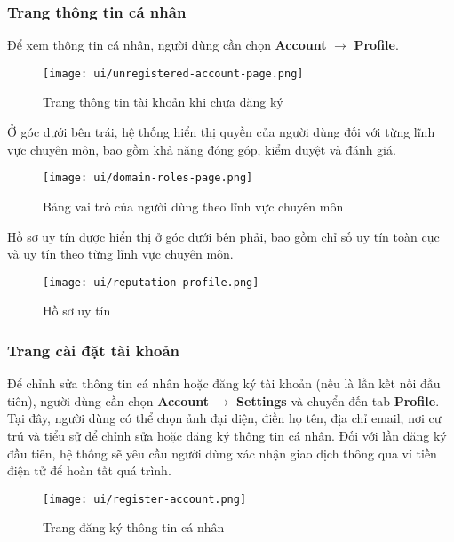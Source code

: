 \subsubsection{Trang thông tin cá nhân}

Để xem thông tin cá nhân, người dùng cần chọn \textbf{Account} $\rightarrow$ \textbf{Profile}.

\begin{figure}[H]
  \centering
  \texttt{[image: ui/unregistered-account-page.png]}
  \caption{Trang thông tin tài khoản khi chưa đăng ký}
  \label{fig:unregistered-account-page}
\end{figure}

Ở góc dưới bên trái, hệ thống hiển thị quyền của người dùng đối với từng lĩnh vực chuyên môn, bao gồm khả năng đóng góp, kiểm duyệt và đánh giá.

\begin{figure}[H]
  \centering
  \texttt{[image: ui/domain-roles-page.png]}
  \caption{Bảng vai trò của người dùng theo lĩnh vực chuyên môn}
  \label{fig:domain-roles-page}
\end{figure}

Hồ sơ uy tín được hiển thị ở góc dưới bên phải, bao gồm chỉ số uy tín toàn cục và uy tín theo từng lĩnh vực chuyên môn.

\begin{figure}[H]
  \centering
  \texttt{[image: ui/reputation-profile.png]}
  \caption{Hồ sơ uy tín}
  \label{fig:reputation-profile}
\end{figure}

\subsubsection{Trang cài đặt tài khoản}

Để chỉnh sửa thông tin cá nhân hoặc đăng ký tài khoản (nếu là lần kết nối đầu tiên), người dùng cần chọn \textbf{Account} $\rightarrow$ \textbf{Settings} và chuyển đến tab \textbf{Profile}.
Tại đây, người dùng có thể chọn ảnh đại diện, điền họ tên, địa chỉ email, nơi cư trú và tiểu sử để chỉnh sửa hoặc đăng ký thông tin cá nhân.  
Đối với lần đăng ký đầu tiên, hệ thống sẽ yêu cầu người dùng xác nhận giao dịch thông qua ví tiền điện tử để hoàn tất quá trình.

\begin{figure}[H]
  \centering
  \texttt{[image: ui/register-account.png]}
  \caption{Trang đăng ký thông tin cá nhân}
  \label{fig:register-account}
\end{figure}

